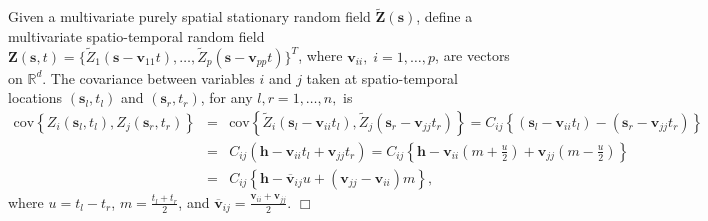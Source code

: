 \documentclass[12pt]{article}
\newcommand{\0}{\mathbf{0}}
\begin{document}
Given a multivariate purely spatial stationary random field $\tilde{\mathbf{Z}}(\mathbf{s})$, define a multivariate spatio-temporal random field 
$\mathbf{Z}(\mathbf{s},t)=\{\tilde{Z}_1\left(\mathbf{s}-\mathbf{v}_{11}t\right),\ldots,\tilde{Z}_p\left(\mathbf{s}-\mathbf{v}_{pp}t\right)\}^T$,
where $\mathbf{v}_{ii},\;i=1,\ldots,p$, are vectors on $\mathbb{R}^d$. The covariance between variables $i$ and $j$ taken at spatio-temporal locations $(\mathbf{s}_l,t_l)$ and $(\mathbf{s}_r,t_r)$, for any $l,r=1,\ldots,n,$ is
\begin{eqnarray*}
\mbox{cov}\left\{Z_{i}(\mathbf{s}_l,t_l),Z_{j}(\mathbf{s}_r,t_r)\right\} &=& \text{cov}\left\{\tilde{Z}_{i}(\mathbf{s}_l-\mathbf{v}_{ii}t_l),\tilde{Z}_{j}(\mathbf{s}_r-\mathbf{v}_{jj}t_r)\right\}
=C_{ij}\left\{\left(\mathbf{s}_l-\mathbf{v}_{ii}t_l\right)-\left(\mathbf{s}_r-\mathbf{v}_{jj}t_r\right)\right\}\\
&=& C_{ij}\left(\mathbf{h}-\mathbf{v}_{ii}t_l+\mathbf{v}_{jj}t_r\right)
=C_{ij}\left\{\mathbf{h}-\mathbf{v}_{ii}\left(m+\frac{u}{2}\right)+\mathbf{v}_{jj}\left(m-\frac{u}{2}\right)\right\}\\
&=& C_{ij}\left\{\mathbf{h}-\overline{\mathbf{v}}_{ij}u+\left(\mathbf{v}_{jj}-\mathbf{v}_{ii}\right)m\right\},
\end{eqnarray*}
where $u=t_l-t_r$, $m=\frac{t_l+t_r}{2}$, and $\overline{\mathbf{v}}_{ij}=\frac{\mathbf{v}_{ii}+\mathbf{v}_{jj}}{2}$. \hfill $\Box$



\baselineskip=20pt
%


\end{document}
